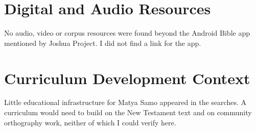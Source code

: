 \documentclass[12pt]{article}
\begin{document}
\section{Digital and Audio Resources}
No audio, video or corpus resources were found beyond the Android Bible app mentioned by Joshua Project. I did not find a link for the app.

\section{Curriculum Development Context}
Little educational infrastructure for Matya Samo appeared in the searches. A curriculum would need to build on the New Testament text and on community orthography work, neither of which I could verify here.
\end{document}
